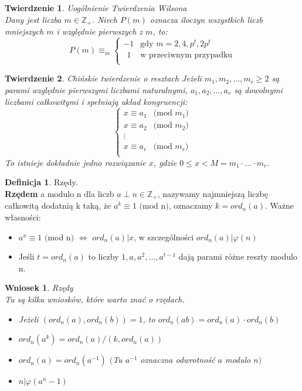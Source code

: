 \documentclass[10pt,a4paper]{article}
\theoremstyle{plain}
\newtheorem{thm}{Twierdzenie}[section]
\newtheorem*{cor}{Wniosek}
\theoremstyle{definition}
\newtheorem{defi}{Definicja}[section]
\theoremstyle{remark}
\newcommand{\Z}{\mathbb{Z}}
\begin{document}
	\begin{thm}{Uogólnienie Twierdzenia Wilsona}
		\\
		Dany jest liczba $m \in \Z_{+}$. Niech $P(m)$ oznacza iloczyn wszystkich liczb mniejszych $m$ i względnie pierwszych z $m$, to:
		$$
		P(m) \equiv_m
		\left\{ \begin{array}{ll}
		-1 & \textrm{gdy } m= 2, 4, p^t, 2p^t \\
		~~ 1 & \textrm{w przeciwnym przypadku}\\
		\end{array} \right.
		$$
	\end{thm}
	\begin{thm}{Chińskie twierdzenie o resztach}
		Jeżeli $m_1,m_2,\ldots,m_r \geq 2$ są parami względnie pierwszymi liczbami naturalnymi, $a_1,a_2,\ldots,a_r$ są dowolnymi liczbami całkowitymi i spełniają układ kongruencji:
		$$
		\left\{ \begin{array}{ll}
		x \equiv a_1 & \textrm{$($mod {$m_1$}$)$}\\
		x \equiv a_2 & \textrm{$($mod {$m_2$}$)$}\\
		\vdots\\
		x \equiv a_r & \textrm{$($mod {$m_r$}$)$}\\
		\end{array} \right.
		$$
		To istnieje dokładnie jedno rozwiązanie $x$, gdzie $0 \leq x < M=m_1\cdot\ldots\cdot m_r$.
	\end{thm}
	\begin{defi}{Rzędy.}
		\\
		\textbf{Rzędem} a modulo n dla liczb $a \perp n \in \Z_{+}$, nazywamy najmniejszą liczbę całkowitą dodatnią k taką, że $a^k \equiv 1$ $($mod n$)$, oznaczamy $k=ord_n(a)$.
		Ważne własności:
		\begin{itemize}
			\item $a^x \equiv 1$ $($mod n$)$ $\Longleftrightarrow$ $ord_n(a)|x$, w szczególności $ord_n(a)|\varphi(n)$
			\item Jeśli $t=ord_n(a)$ to liczby $1,a,a^2,\ldots,a^{t-1}$ dają parami różne reszty modulo n.
		\end{itemize}
	\end{defi}
	\begin{cor}{Rzędy}
		\\
		Tu są kilka wniosków, które warto znać o rzędach.
		\begin{itemize}
			\item 
			Jeżeli $(ord_n(a),ord_n(b))=1$, to $ord_n(ab)=ord_n(a)\cdot ord_n(b)$
			\item
			$ord_n(a^k)={ord_n(a)}/{(k,ord_n(a))}$
			\item
			$ord_n(a)=ord_n(a^{-1})$ $($Tu $a^{-1}$ oznaczna odwrotność $a$ modulo $n$$)$
			\item
			$n|\varphi(a^n-1)$
		\end{itemize}
	\end{cor}
\end{document}
